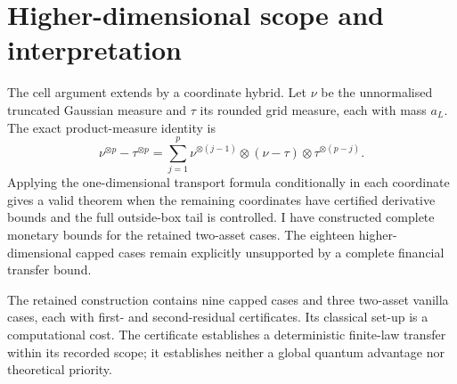 \documentclass[11pt]{article}
\begin{document}
\section{Higher-dimensional scope and interpretation}
The cell argument extends by a coordinate hybrid. Let $\nu$ be the unnormalised truncated Gaussian measure and $\tau$ its rounded grid measure, each with mass $a_L$. The exact product-measure identity is
\[
 \nu^{\otimes p}-\tau^{\otimes p}
 =\sum_{j=1}^{p}\nu^{\otimes(j-1)}\otimes(\nu-\tau)
      \otimes\tau^{\otimes(p-j)}.
\]
Applying the one-dimensional transport formula conditionally in each coordinate gives a valid theorem when the remaining coordinates have certified derivative bounds and the full outside-box tail is controlled. I have constructed complete monetary bounds for the retained two-asset cases. The eighteen higher-dimensional capped cases remain explicitly unsupported by a complete financial transfer bound.

The retained construction contains nine capped cases and three two-asset vanilla cases, each with first- and second-residual certificates. Its classical set-up is a computational cost. The certificate establishes a deterministic finite-law transfer within its recorded scope; it establishes neither a global quantum advantage nor theoretical priority.
\end{document}
